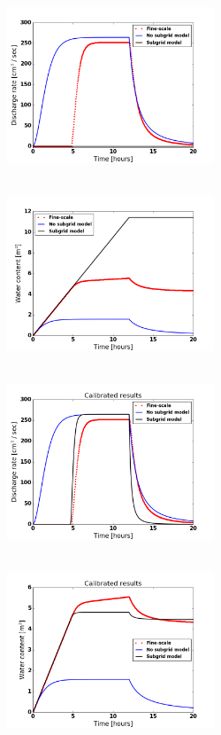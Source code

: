 \documentclass[review,11pt]{elsarticle}
\begin{document}
\begin{figure}[!h]
\centering
\includegraphics[width=6.2cm, height=5.5cm]{./figures/POLYGON_A01/POLYGON_A01discharge.png}
\includegraphics[width=6.2cm, height=5.5cm]{./figures/POLYGON_A01/POLYGON_A01watercontent.png}\\
\includegraphics[width=6.2cm, height=5.5cm]{./figures/POLYGON_A01/POLYGON_A01dischargeCalibDD.png}
\includegraphics[width=6.2cm, height=5.5cm]{./figures/POLYGON_A01/POLYGON_A01watercontentCalibDD.png} \\

\end{figure}
\end{document}
